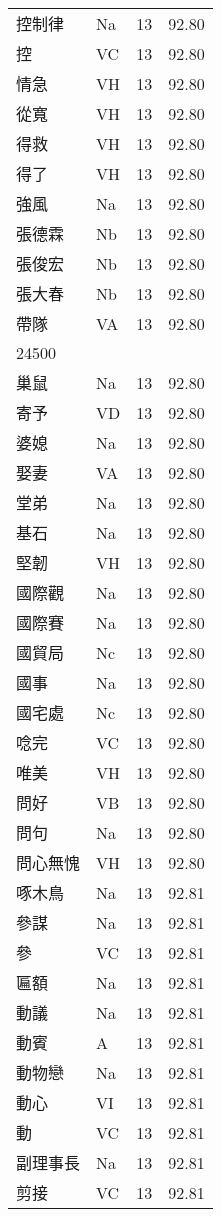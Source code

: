 \documentclass[twocolumn]{book}
\begin{document}
\begin{supertabular}{llrr}
控制律 & Na & 13 &  92.80\\
控 & VC & 13 &  92.80\\
情急 & VH & 13 &  92.80\\
從寬 & VH & 13 &  92.80\\
得救 & VH & 13 &  92.80\\
得了 & VH & 13 &  92.80\\
強風 & Na & 13 &  92.80\\
張德霖 & Nb & 13 &  92.80\\
張俊宏 & Nb & 13 &  92.80\\
張大春 & Nb & 13 &  92.80\\
帶隊 & VA & 13 &  92.80\\
24500\\
巢鼠 & Na & 13 &  92.80\\
寄予 & VD & 13 &  92.80\\
婆媳 & Na & 13 &  92.80\\
娶妻 & VA & 13 &  92.80\\
堂弟 & Na & 13 &  92.80\\
基石 & Na & 13 &  92.80\\
堅韌 & VH & 13 &  92.80\\
國際觀 & Na & 13 &  92.80\\
國際賽 & Na & 13 &  92.80\\
國貿局 & Nc & 13 &  92.80\\
國事 & Na & 13 &  92.80\\
國宅處 & Nc & 13 &  92.80\\
唸完 & VC & 13 &  92.80\\
唯美 & VH & 13 &  92.80\\
問好 & VB & 13 &  92.80\\
問句 & Na & 13 &  92.80\\
問心無愧 & VH & 13 &  92.80\\
啄木鳥 & Na & 13 &  92.81\\
參謀 & Na & 13 &  92.81\\
參 & VC & 13 &  92.81\\
匾額 & Na & 13 &  92.81\\
動議 & Na & 13 &  92.81\\
動賓 & A & 13 &  92.81\\
動物戀 & Na & 13 &  92.81\\
動心 & VI & 13 &  92.81\\
動 & VC & 13 &  92.81\\
副理事長 & Na & 13 &  92.81\\
剪接 & VC & 13 &  92.81\\

\end{supertabular}
\end{document}
